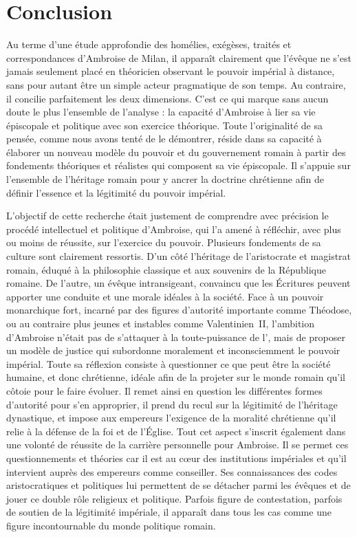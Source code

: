 \chapter*{Conclusion}
\setcounter{footnote}{0}
\clearpage

Au terme d'une étude approfondie des homélies, exégèses, traités et correspondances d'Ambroise de Milan, il apparaît clairement que l'évêque ne s'est jamais seulement placé en théoricien observant le pouvoir impérial à distance, sans pour autant être un simple acteur pragmatique de son temps. Au contraire, il concilie parfaitement les deux dimensions. C'est ce qui marque sans aucun doute le plus l'ensemble de l'analyse : la capacité d'Ambroise à lier sa vie épiscopale et politique avec son exercice théorique. Toute l'originalité de sa pensée, comme nous avons tenté de le démontrer, réside dans sa capacité à élaborer un nouveau modèle du pouvoir et du gouvernement romain à partir des fondements théoriques et réalistes qui composent sa vie épiscopale. Il s'appuie sur l'ensemble de l'héritage romain pour y ancrer la doctrine chrétienne afin de définir l'essence et la légitimité du pouvoir impérial.

\bigskip

L'objectif de cette recherche était justement de comprendre avec précision le procédé intellectuel et politique d'Ambroise, qui l'a amené à réfléchir, avec plus ou moins de réussite, sur l'exercice du pouvoir. Plusieurs fondements de sa culture sont clairement ressortis. D'un côté l'héritage de l'aristocrate et magistrat romain, éduqué à la philosophie classique et aux souvenirs de la République romaine. De l'autre, un évêque intransigeant, convaincu que les Écritures peuvent apporter une conduite et une morale idéales à la société. Face à un pouvoir monarchique fort, incarné par des figures d'autorité importante comme Théodose, ou au contraire plus jeunes et instables comme Valentinien~II, l'ambition d'Ambroise n'était pas de s'attaquer à la toute-puissance de l', mais de proposer un modèle de justice qui subordonne moralement et inconsciemment le pouvoir impérial. Toute sa réflexion consiste à questionner ce que peut être la société humaine, et donc chrétienne, idéale afin de la projeter sur le monde romain qu'il côtoie pour le faire évoluer. Il remet ainsi en question les différentes formes d'autorité pour s'en approprier, il prend du recul sur la légitimité de l'héritage dynastique, et impose aux empereurs l'exigence de la moralité chrétienne qu'il relie à la défense de la foi et de l'Église. Tout cet aspect s'inscrit également dans une volonté de réussite de la carrière personnelle pour Ambroise. Il se permet ces questionnements et théories car il est au cœur des institutions impériales et qu'il intervient auprès des empereurs comme conseiller. Ses connaissances des codes aristocratiques et politiques lui permettent de se détacher parmi les évêques et de jouer ce double rôle religieux et politique. Parfois figure de contestation, parfois de soutien de la légitimité impériale, il apparaît dans tous les cas comme une figure incontournable du monde politique romain.


